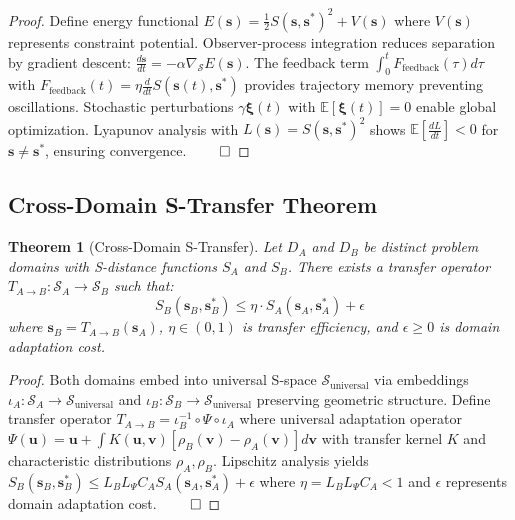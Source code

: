 \documentclass[11pt]{article}
\newtheorem{theorem}{Theorem}
\begin{document}
\begin{proof}
Define energy functional $E(\mathbf{s}) = \frac{1}{2} S(\mathbf{s}, \mathbf{s}^*)^2 + V(\mathbf{s})$ where $V(\mathbf{s})$ represents constraint potential. Observer-process integration reduces separation by gradient descent: $\frac{d\mathbf{s}}{dt} = -\alpha \nabla_{\mathcal{S}} E(\mathbf{s})$. The feedback term $\int_0^t F_{\text{feedback}}(\tau) d\tau$ with $F_{\text{feedback}}(t) = \eta \frac{d}{dt} S(\mathbf{s}(t), \mathbf{s}^*)$ provides trajectory memory preventing oscillations. Stochastic perturbations $\gamma \mathbf{\xi}(t)$ with $\mathbb{E}[\mathbf{\xi}(t)] = 0$ enable global optimization. Lyapunov analysis with $L(\mathbf{s}) = S(\mathbf{s}, \mathbf{s}^*)^2$ shows $\mathbb{E}[\frac{dL}{dt}] < 0$ for $\mathbf{s} \neq \mathbf{s}^*$, ensuring convergence. $\qed$
\end{proof}

\subsection{Cross-Domain S-Transfer Theorem}

\begin{theorem}[Cross-Domain S-Transfer]
\label{thm:cross_domain}
Let $D_A$ and $D_B$ be distinct problem domains with S-distance functions $S_A$ and $S_B$. There exists a transfer operator $T_{A \to B}: \mathcal{S}_A \to \mathcal{S}_B$ such that:
\begin{equation}
S_B(\mathbf{s}_B, \mathbf{s}_B^*) \leq \eta \cdot S_A(\mathbf{s}_A, \mathbf{s}_A^*) + \epsilon
\end{equation}
where $\mathbf{s}_B = T_{A \to B}(\mathbf{s}_A)$, $\eta \in (0, 1)$ is transfer efficiency, and $\epsilon \geq 0$ is domain adaptation cost.
\end{theorem}

\begin{proof}
Both domains embed into universal S-space $\mathcal{S}_{\text{universal}}$ via embeddings $\iota_A: \mathcal{S}_A \to \mathcal{S}_{\text{universal}}$ and $\iota_B: \mathcal{S}_B \to \mathcal{S}_{\text{universal}}$ preserving geometric structure. Define transfer operator $T_{A \to B} = \iota_B^{-1} \circ \Psi \circ \iota_A$ where universal adaptation operator $\Psi(\mathbf{u}) = \mathbf{u} + \int K(\mathbf{u}, \mathbf{v})[\rho_B(\mathbf{v}) - \rho_A(\mathbf{v})] d\mathbf{v}$ with transfer kernel $K$ and characteristic distributions $\rho_A, \rho_B$. Lipschitz analysis yields $S_B(\mathbf{s}_B, \mathbf{s}_B^*) \leq L_B L_{\Psi} C_A S_A(\mathbf{s}_A, \mathbf{s}_A^*) + \epsilon$ where $\eta = L_B L_{\Psi} C_A < 1$ and $\epsilon$ represents domain adaptation cost. $\qed$
\end{proof}
\end{document}
